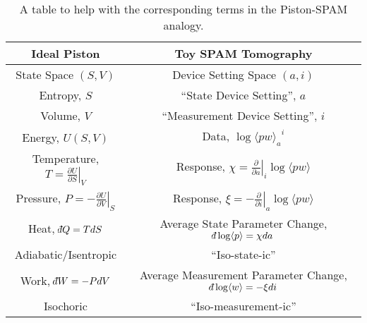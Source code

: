 \documentclass[pra, 10pt, notitlepage, twocolumn]{revtex4-1}
\def\dbar{{\mathchar'26\mkern-12mu d}}
\begin{document}
\begin{widetext}

\begin{table}[h!]
\vspace{-10pt}
\begin{tabular}{c|c}
Ideal Piston & Toy SPAM Tomography\\\hline
State Space $(S,V)$ & Device Setting Space $(a,i)$\\
Entropy, $S$ & ``State Device Setting'', $a$\\
Volume, $V$ & ``Measurement Device Setting'', $i$\\
Energy, $U(S,V)$ & Data, $\log {\langle pw \rangle_a}^i$\\
Temperature, $T = \left.\frac{\partial U}{\partial S}\right|_V$ & Response, $\chi = \left.\frac{\partial}{\partial a}\right|_i \!\!\log \langle pw \rangle$ \\
Pressure, $P = -\left.\frac{\partial U}{\partial V}\right|_S$ & Response, $\xi = -\left.\frac{\partial}{\partial i}\right|_a \!\log \langle pw \rangle$\\
Heat, $\dbar Q = T dS$ & Average State Parameter Change, $\dbar \log \langle p \rangle = \chi da$\\
Adiabatic/Isentropic & ``Iso-state-ic''\\
Work, $\dbar W = -PdV$ & Average Measurement Parameter Change, $\dbar \log \langle w \rangle = - \xi di$\\
Isochoric & ``Iso-measurement-ic''\\
\end{tabular}
\caption{A table to help with the corresponding terms in the Piston-SPAM analogy.
}\label{correspond}
\end{table}

\end{widetext}
\end{document}
